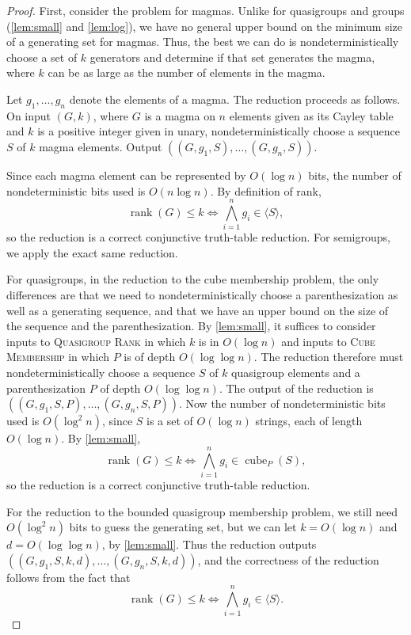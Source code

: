 \documentclass{article}
\newcommand{\gen}[1]{\langle #1 \rangle}
\DeclareMathOperator{\cube}{cube}
\DeclareMathOperator{\rank}{rank}
\begin{document}
\begin{proof}
  First, consider the problem for magmas.
  Unlike for quasigroups and groups (\autoref{lem:small} and \autoref{lem:log}), we have no general upper bound on the minimum size of a generating set for magmas.
  Thus, the best we can do is nondeterministically choose a set of $k$ generators and determine if that set generates the magma, where $k$ can be as large as the number of elements in the magma.

  Let $g_1, \dotsc, g_n$ denote the elements of a magma.
  The reduction proceeds as follows.
  On input $(G, k)$, where $G$ is a magma on $n$ elements given as its Cayley table and $k$ is a positive integer given in unary, nondeterministically choose a sequence $S$ of $k$ magma elements.
  Output $((G, g_1, S), \dotsc, (G, g_n, S))$.

  Since each magma element can be represented by $O(\log n)$ bits, the number of nondeterministic bits used is $O(n \log n)$.
  By definition of rank,
  \begin{equation*}
    \rank(G) \leq k \iff \bigwedge_{i = 1}^n g_i \in \gen{S},
  \end{equation*}
  so the reduction is a correct conjunctive truth-table reduction.
  For semigroups, we apply the exact same reduction.

  For quasigroups, in the reduction to the cube membership problem, the only differences are that we need to nondeterministically choose a parenthesization as well as a generating sequence, and that we have an upper bound on the size of the sequence and the parenthesization.
  By \autoref{lem:small}, it suffices to consider inputs to \textsc{Quasigroup Rank} in which $k$ is in $O(\log n)$ and inputs to \textsc{Cube Membership} in which $P$ is of depth $O(\log \log n)$.
  The reduction therefore must nondeterministically choose a sequence $S$ of $k$ quasigroup elements and a parenthesization $P$ of depth $O(\log \log n)$.
  The output of the reduction is $((G, g_1, S, P), \dotsc, (G, g_n, S, P))$.
  Now the number of nondeterministic bits used is $O(\log^2 n)$, since $S$ is a set of $O(\log n)$ strings, each of length $O(\log n)$.
  By \autoref{lem:small},
  \begin{equation*}
    \rank(G) \leq k \iff \bigwedge_{i = 1}^n g_i \in \cube_P(S),
  \end{equation*}
  so the reduction is a correct conjunctive truth-table reduction.

  For the reduction to the bounded quasigroup membership problem, we still need $O(\log^2 n)$ bits to guess the generating set, but we can let $k = O(\log n)$ and $d = O(\log \log n)$, by \autoref{lem:small}.
  Thus the reduction outputs $((G, g_1, S, k, d), \dotsc, (G, g_n, S, k, d))$, and the correctness of the reduction follows from the fact that
  \begin{equation*}
    \rank(G) \leq k \iff \bigwedge_{i = 1}^n g_i \in \gen{S}.
  \end{equation*}


\end{proof}
\end{document}
